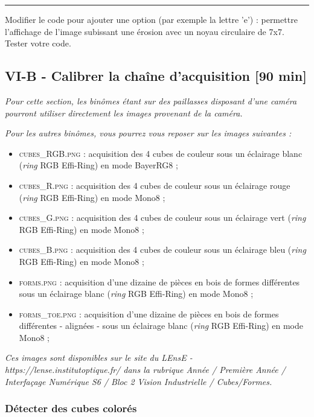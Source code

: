\documentclass[a4paper,11pt,titlepage]{article} %
\begin{document}
\noindent \rule{\linewidth}{1pt}

\Manip Modifier le code pour ajouter une option (par exemple la lettre 'e') : permettre l'affichage de l'image subissant une érosion avec un noyau circulaire de 7x7. Tester votre code.

\subsection{VI-B - Calibrer la chaîne d'acquisition {[90 min]}}


\textit{Pour cette section, les binômes étant sur des paillasses disposant d'une caméra pourront utiliser directement les images provenant de la caméra.}

\textit{Pour les autres binômes, vous pourrez vous reposer sur les images suivantes :}

\begin{itemize}
	\item \textsc{cubes\_RGB.png} : acquisition des 4 cubes de couleur sous un éclairage blanc (\textit{ring} RGB Effi-Ring) en mode BayerRG8 ;
	\item \textsc{cubes\_R.png} : acquisition des 4 cubes de couleur sous un éclairage rouge (\textit{ring} RGB Effi-Ring) en mode Mono8 ;
	\item \textsc{cubes\_G.png} : acquisition des 4 cubes de couleur sous un éclairage vert (\textit{ring} RGB Effi-Ring) en mode Mono8 ;
	\item \textsc{cubes\_B.png} : acquisition des 4 cubes de couleur sous un éclairage bleu (\textit{ring} RGB Effi-Ring) en mode Mono8 ;
	\medskip
	\item \textsc{forms.png} : acquisition d'une dizaine de pièces en bois de formes différentes sous un éclairage blanc (\textit{ring} RGB Effi-Ring) en mode Mono8 ;
	\item \textsc{forms\_toe.png} : acquisition d'une dizaine de pièces en bois de formes différentes - alignées - sous un éclairage blanc (\textit{ring} RGB Effi-Ring) en mode Mono8 ;
\end{itemize}

\bigskip

\textit{Ces images sont disponibles sur le site du LEnsE - https://lense.institutoptique.fr/ dans la rubrique Année / Première Année / Interfaçage Numérique S6 / Bloc 2 Vision Industrielle / Cubes/Formes.}



\subsubsection{Détecter des cubes colorés}
\end{document}
